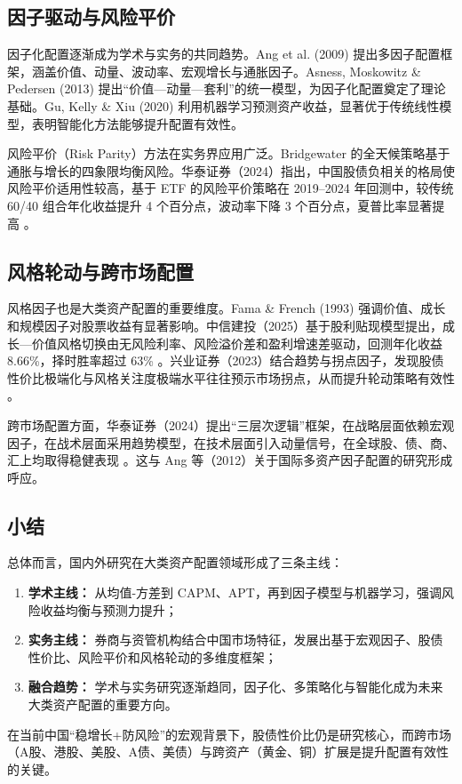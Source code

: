\documentclass[a4paper,12pt]{article}
\numberwithin{equation}{section}
\begin{document}
\subsection{因子驱动与风险平价}
因子化配置逐渐成为学术与实务的共同趋势。Ang et al. (2009) \cite{Ang2009} 提出多因子配置框架，涵盖价值、动量、波动率、宏观增长与通胀因子。Asness, Moskowitz \& Pedersen (2013) \cite{Asness2013} 提出“价值—动量—套利”的统一模型，为因子化配置奠定了理论基础。Gu, Kelly \& Xiu (2020) \cite{Gu2020} 利用机器学习预测资产收益，显著优于传统线性模型，表明智能化方法能够提升配置有效性。

风险平价（Risk Parity）方法在实务界应用广泛。Bridgewater 的全天候策略基于通胀与增长的四象限均衡风险。华泰证券（2024）指出，中国股债负相关的格局使风险平价适用性较高，基于 ETF 的风险平价策略在 2019–2024 年回测中，较传统 60/40 组合年化收益提升 4 个百分点，波动率下降 3 个百分点，夏普比率显著提高 \cite{HT2024_riskparity}。

\subsection{风格轮动与跨市场配置}
风格因子也是大类资产配置的重要维度。Fama \& French (1993) \cite{FamaFrench1993} 强调价值、成长和规模因子对股票收益有显著影响。中信建投（2025）基于股利贴现模型提出，成长—价值风格切换由无风险利率、风险溢价差和盈利增速差驱动，回测年化收益 8.66\%，择时胜率超过 63\% \cite{CSC2025_growthvalue}。兴业证券（2023）结合趋势与拐点因子，发现股债性价比极端化与风格关注度极端水平往往预示市场拐点，从而提升轮动策略有效性 \cite{Industrial2023_turningpoint}。

跨市场配置方面，华泰证券（2024）提出“三层次逻辑”框架，在战略层面依赖宏观因子，在战术层面采用趋势模型，在技术层面引入动量信号，在全球股、债、商、汇上均取得稳健表现 \cite{HT2024_global}。这与 Ang 等（2012）关于国际多资产因子配置的研究形成呼应。

\subsection{小结}
总体而言，国内外研究在大类资产配置领域形成了三条主线：
\begin{enumerate}
    \item \textbf{学术主线：} 从均值-方差到 CAPM、APT，再到因子模型与机器学习，强调风险收益均衡与预测力提升；
    \item \textbf{实务主线：} 券商与资管机构结合中国市场特征，发展出基于宏观因子、股债性价比、风险平价和风格轮动的多维度框架；
    \item \textbf{融合趋势：} 学术与实务研究逐渐趋同，因子化、多策略化与智能化成为未来大类资产配置的重要方向。
\end{enumerate}
在当前中国“稳增长+防风险”的宏观背景下，股债性价比仍是研究核心，而跨市场（A股、港股、美股、A债、美债）与跨资产（黄金、铜）扩展是提升配置有效性的关键。
\end{document}
